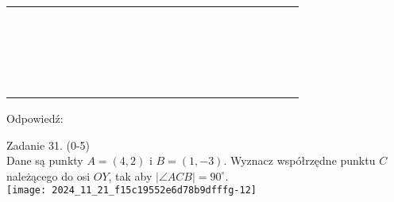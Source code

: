 \documentclass[10pt]{article}
\begin{document}
\begin{center}
\begin{tabular}{|c|c|c|c|c|c|c|c|c|c|c|c|c|c|c|c|c|c|c|c|c|c|c|}
\hline
 &  &  &  &  &  &  &  &  &  &  &  &  &  &  &  &  &  &  &  &  &  &  \\
\hline
 &  &  &  &  &  &  &  &  &  &  &  &  &  &  &  &  &  &  &  &  &  &  \\
\hline
 &  &  &  &  &  &  &  &  &  &  &  &  &  &  &  &  &  &  &  &  &  &  \\
\hline
 &  &  &  &  &  &  &  &  &  &  &  &  &  &  &  &  &  &  &  &  &  &  \\
\hline
 &  &  &  &  &  &  &  &  &  &  &  &  &  &  &  &  &  &  &  &  &  &  \\
\hline
 &  &  &  &  &  &  &  &  &  &  &  &  &  &  &  &  &  &  &  &  &  &  \\
\hline
 &  &  &  &  &  &  &  &  &  &  &  &  &  &  &  &  &  &  &  &  &  &  \\
\hline
 &  &  &  &  &  &  &  &  &  &  &  &  &  &  &  &  &  &  &  &  &  &  \\
\hline
 &  &  &  &  &  &  &  &  &  &  &  &  &  &  &  &  &  &  &  &  &  &  \\
\hline
 &  &  &  &  &  &  &  &  &  &  &  &  &  &  &  &  &  &  &  &  &  &  \\
\hline
 &  &  &  &  &  &  &  &  &  &  &  &  &  &  &  &  &  &  &  &  &  &  \\
\hline
 &  &  &  &  &  &  &  &  &  &  &  &  &  &  &  &  &  &  &  &  &  &  \\
\hline
 &  &  &  &  &  &  &  &  &  &  &  &  &  &  &  &  &  &  &  &  &  &  \\
\hline
 &  &  &  &  &  &  &  &  &  &  &  &  &  &  &  &  &  &  &  &  &  &  \\
\hline
 &  &  &  &  &  &  &  &  &  &  &  &  &  &  &  &  &  &  &  &  &  &  \\
\hline
 &  &  &  &  &  &  &  &  &  &  &  &  &  &  &  &  &  &  &  &  &  &  \\
\hline
 &  &  &  &  &  &  &  &  &  &  &  &  &  &  &  &  &  &  &  &  &  &  \\
\hline
 &  &  &  &  &  &  &  &  &  &  &  &  &  &  &  &  &  &  &  &  &  &  \\
\hline
 &  &  &  &  &  &  &  &  &  &  &  &  &  &  &  &  &  &  &  &  &  &  \\
\hline
 &  &  &  &  &  &  &  &  &  &  &  &  &  &  &  &  &  &  &  &  &  &  \\
\hline
\end{tabular}
\end{center}

Odpowiedź:

Zadanie 31. (0-5)\\
Dane są punkty \(A=(4,2)\) i \(B=(1,-3)\). Wyznacz współrzędne punktu \(C\) należącego do osi \(O Y\), tak aby \(|\angle A C B|=90^{\circ}\).\\
\texttt{[image: 2024\_11\_21\_f15c19552e6d78b9dfffg-12]}
\end{document}
